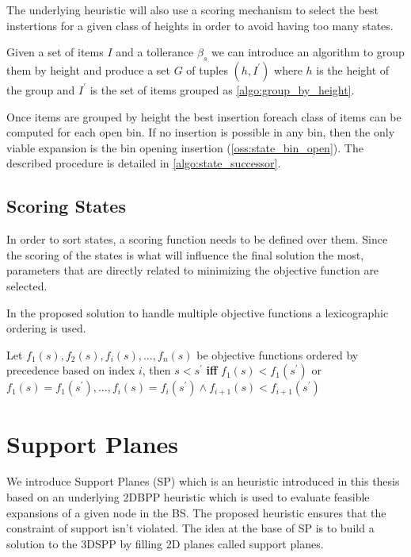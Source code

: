 The underlying heuristic will also use a scoring mechanism to select the best instertions for a given class of heights in order to avoid having too many states.

Given a set of items $I$ and a tollerance $\beta_s$ we can introduce an algorithm to group them by height and produce a set $G$ of tuples $(h, I^\prime)$ where $h$ is the height of the group and $I^\prime$ is the set of items grouped as \cref{algo:group_by_height}.



Once items are grouped by height the best insertion foreach class of items can be computed for each open bin. If no insertion is possible in any bin, then the only viable expansion is the bin opening insertion (\cref{oss:state_bin_open}).
The described procedure is detailed in \cref{algo:state_successor}.



\subsection{Scoring States}
\label{ssec:scoring_states}%
In order to sort states, a scoring function needs to be defined over them.
Since the scoring of the states is what will influence the final solution the most, parameters that are directly related to minimizing the objective function are selected.

In the proposed solution to handle multiple objective functions a lexicographic ordering is used.
\begin{definition}
    \label{def:lexicographic_ordering}
    Let $f_1(s), f_2(s), f_i(s), \dots, f_n(s)$ be objective functions ordered by precedence based on index $i$, then $s < s^\prime$ \textbf{iff} $f_1(s) < f_1(s^\prime)$ or $f_1(s) = f_1(s^\prime), \dots, f_i(s) = f_i(s^\prime) \land f_{i+1}(s) < f_{i+1}(s^\prime)$
\end{definition}


\section{Support Planes}
\label{sec:support_planes}%
We introduce Support Planes (SP) which is an heuristic introduced in this thesis based on an underlying 2DBPP heuristic which is used to evaluate feasible expansions of a given node in the BS.
The proposed heuristic ensures that the constraint of support isn't violated.
The idea at the base of SP is to build a solution to the 3DSPP by filling 2D planes called support planes.

